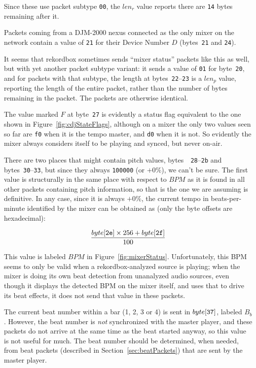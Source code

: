 \documentclass[11pt]{article}
\begin{document}
Since these use packet subtype {\tt 00}, the $len_r$ value reports
there are {\tt 14} bytes remaining after it.

Packets coming from a DJM-2000 nexus connected as the only mixer on
the network contain a value of {\tt 21} for their Device Number $D$
(bytes~{\tt 21} and {\tt 24}).

It seems that rekordbox sometimes sends ``mixer status'' packets like
this as well, but with yet another packet subtype variant: it sends a
value of {\tt 01} for byte~{\tt 20}, and for packets with that
subtype, the length at bytes~{\tt 22}--{\tt 23} is a $len_p$ value,
reporting the length of the entire packet, rather than the number of
bytes remaining in the packet. The packets are otherwise identical.

The value marked $F$ at byte~{\tt 27} is evidently a status flag
equivalent to the one shown in Figure~\ref{fig:cdjStateFlags},
although on a mixer the only two values seen so far are {\tt f0} when
it is the tempo master, and {\tt d0} when it is not. So evidently the
mixer always considers itself to be playing and synced, but never
on-air.

There are two places that might contain pitch values, bytes~{\tt
  28}--{\tt 2b} and bytes~{\tt 30}--{\tt 33}, but since they always
{\tt 100000} (or $+0\%$), we can't be sure. The first value is
structurally in the same place with respect to $BPM$ as it is found in
all other packets containing pitch information, so that is the one we
are assuming is definitive. In any case, since it is always $+0\%$,
the current tempo in beats-per-minute identified by the mixer can be
obtained as (only the byte offsets are hexadecimal):

\[ \frac{byte[{\tt 2e}] \times 256 + byte[{\tt 2f}]}{100} \]

This value is labeled $BPM$ in Figure~\ref{fig:mixerStatus}.
Unfortunately, this BPM seems to only be valid when a
rekordbox-analyzed source is playing; when the mixer is doing its own
beat detection from unanalyzed audio sources, even though it displays
the detected BPM on the mixer itself, and uses that to drive its beat
effects, it does not send that value in these packets.

The current beat number within a bar (1, 2, 3 or 4) is sent in
$byte[{\tt 37}]$, labeled $B_b$. However, the beat number is
\emph{not} synchronized with the master player, and these packets do
not arrive at the same time as the beat started anyway, so this value
is not useful for much. The beat number should be determined, when
needed, from beat packets (described in Section~\ref{sec:beatPackets})
that are sent by the master player.
\end{document}

